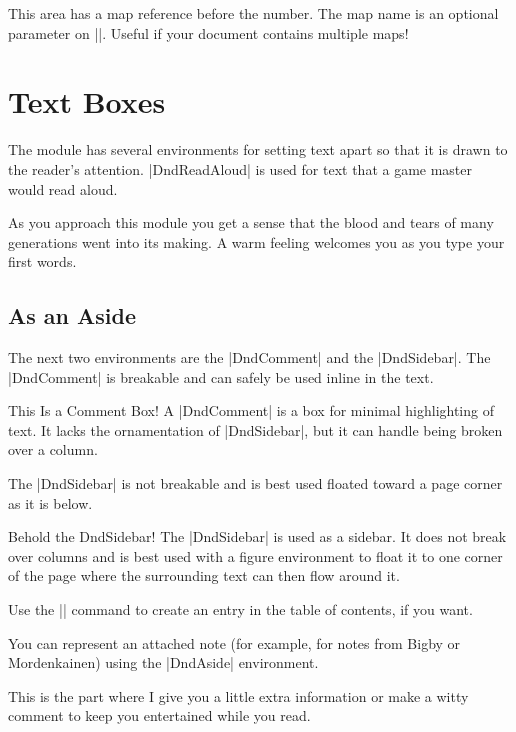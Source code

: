 \documentclass[letterpaper,twocolumn,openany,nodeprecatedcode]{dndbook}
\begin{document}
This area has a map reference before the number. The map name is an optional parameter on |\DndArea|. Useful if your document contains multiple maps!

\chapter{Text Boxes}

The module has several environments for setting text apart so that it is drawn to the reader's attention. |DndReadAloud| is used for text that a game master would read aloud.

\begin{DndReadAloud}
  As you approach this module you get a sense that the blood and tears of many generations went into its making. A warm feeling welcomes you as you type your first words.
\end{DndReadAloud}

\section{As an Aside}
The next two environments are the |DndComment| and the |DndSidebar|. The |DndComment| is breakable and can safely be used inline in the text.

\begin{DndComment}{This Is a Comment Box!}
  A |DndComment| is a box for minimal highlighting of text. It lacks the ornamentation of |DndSidebar|, but it can handle being broken over a column.
\end{DndComment}

The |DndSidebar| is not breakable and is best used floated toward a page corner as it is below.

\begin{DndSidebar}[float=!b]{Behold the DndSidebar!}
  The |DndSidebar| is used as a sidebar. It does not break over columns and is best used with a figure environment to float it to one corner of the page where the surrounding text can then flow around it.

  Use the || command to create an entry in the table of contents, if you want.
\end{DndSidebar}

You can represent an attached note (for example, for notes from Bigby or Mordenkainen) using the |DndAside| environment.

\begin{DndAside}
  This is the part where I give you a little extra information or make a witty comment to keep you entertained while you read.
\end{DndAside}
\end{document}
